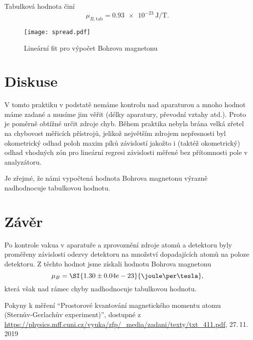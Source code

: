 \documentclass{scirep}
\begin{document}
    Tabulková hodnota činí \[ \mu_{B, \text{tab}} = \SI{0.93 e-23}{\joule\per\tesla}. \]
    
\begin{figure}[h!]
    \centering
    \texttt{[image: spread.pdf]}
    \vspace{0pt}
    \caption{Lineární fit pro výpočet Bohrova magnetonu}
    \label{fig:spread}
\end{figure}


    \section*{Diskuse}

    V tomto praktiku v podstatě nemáme kontrolu nad aparaturou a mnoho hodnot máme zadané a musíme jim věřit (délky aparatury, převodní vztahy atd.).
    Proto je poměrně obtížné určit zdroje chyb.
    Během praktika nebyla brána velká zřetel na chybovost měřicích přístrojů, jelikož největším zdrojem nepřesnosti byl okometrický odhad poloh maxim píků závislostí jakožto i (taktéž okometrický) odhad vhodných zón pro lineární regresi závislosti měřené bez přítomnosti pole v analyzátoru.

    Je zřejmé, že námi vypočtená hodnota Bohrova magnetonu výrazně nadhodnocuje tabulkovou hodnotu.

    \section*{Závěr}

    Po kontrole vakua v aparatuře a zprovoznění zdroje atomů a detektoru byly proměřeny závislosti odezvy detektoru na množství dopadajících atomů na poloze detektoru.
    Z těchto hodnot jsme získali hodnotu Bohrova magnetonu
    \[ \mu_B = \SI{1.30 \pm 0.04 e-23}{\joule\per\tesla}, \]
    která však nad rámec chyby nadhodnocuje tabulkovou hodnotu.

    \begin{thebibliography}{}

        Pokyny k měření ``Prostorové kvantování magnetického momentu atomu (Sternův-Gerlachův experiment)'', dostupné z\\ \url{https://physics.mff.cuni.cz/vyuka/zfp/_media/zadani/texty/txt_411.pdf}, 27.\,11.\,2019

    \end{thebibliography}
\end{document}

